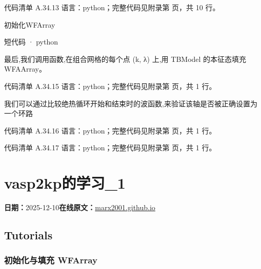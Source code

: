 \documentclass[lang=cn,scheme=chinese,color=blue,device=normal,toc=onecol,math=cm]{elegantbook}
\begin{document}
\begin{codeindexbox}{代码清单 A.34.13}
语言：python；完整代码见附录第 \pageref{code:34:13} 页，共 10 行。
\end{codeindexbox}


初始化WFArray\par


\begin{inlinecodebox}{短代码 · python}
\end{inlinecodebox}


最后,我们调用函数,在组合网格的每个点 (k, λ) 上,用 TBModel 的本征态填充 WFAArray。\par


\begin{codeindexbox}{代码清单 A.34.15}
语言：python；完整代码见附录第 \pageref{code:34:15} 页，共 1 行。
\end{codeindexbox}


我们可以通过比较绝热循环开始和结束时的波函数,来验证该轴是否被正确设置为一个环路\par


\begin{codeindexbox}{代码清单 A.34.16}
语言：python；完整代码见附录第 \pageref{code:34:16} 页，共 1 行。
\end{codeindexbox}


\begin{codeindexbox}{代码清单 A.34.17}
语言：python；完整代码见附录第 \pageref{code:34:17} 页，共 1 行。
\end{codeindexbox}



\section{vasp2kp的学习\_\allowbreak{}1}
\begin{articlemeta}
\textbf{日期：}2025-12-10\hfill\textbf{在线原文：}\href{https://marx2001.github.io/sci-note\_posts/20251210-vasp2kp}{marx2001.github.io}
\end{articlemeta}

\subsection{Tutorials}


\subsubsection{初始化与填充 WFArray}
\end{document}
